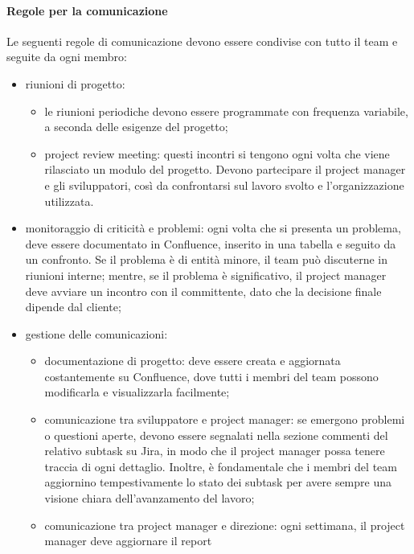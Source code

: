             \paragraph{Regole per la comunicazione}
            Le seguenti regole di comunicazione devono essere condivise con tutto il team e seguite da ogni membro:
            \begin{itemize}
                \item riunioni di progetto:
                \begin{itemize}
                    \item le riunioni periodiche devono essere programmate con frequenza variabile, a seconda delle esigenze del progetto;
                    \item project review meeting: questi incontri si tengono ogni volta che viene rilasciato un modulo del progetto.
                    Devono partecipare il project manager e gli sviluppatori, così da confrontarsi sul lavoro svolto e l'organizzazione utilizzata.
                \end{itemize}
                \item monitoraggio di criticità e problemi: ogni volta che si presenta un problema, deve essere documentato in Confluence,
                inserito in una tabella e seguito da un confronto. Se il problema è di entità minore, il team può discuterne in riunioni
                interne; mentre, se il problema è significativo, il project manager deve avviare un incontro con il committente, dato che
                la decisione finale dipende dal cliente;
                \item gestione delle comunicazioni:
                \begin{itemize}
                    \item documentazione di progetto: deve essere creata e aggiornata costantemente su Confluence, dove tutti i membri
                    del team possono modificarla e visualizzarla facilmente;
                    \item comunicazione tra sviluppatore e project manager: se emergono problemi o questioni aperte, devono essere
                    segnalati nella sezione commenti del relativo subtask su Jira, in modo che il project manager possa tenere
                    traccia di ogni dettaglio. Inoltre, è fondamentale che i membri del team aggiornino tempestivamente lo stato
                    dei subtask per avere sempre una visione chiara dell’avanzamento del lavoro;
                    \item comunicazione tra project manager e direzione: ogni settimana, il project manager deve aggiornare il report

\end{itemize}
\end{itemize}
